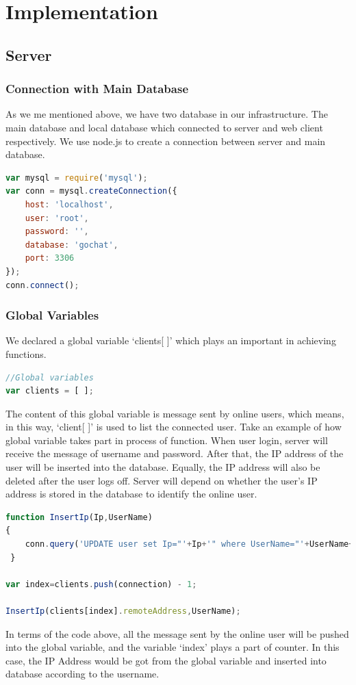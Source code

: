\documentclass[a4paper,11pt]{article}
\begin{document}
\section{Implementation}
\subsection{Server}
\subsubsection{Connection with Main Database}
As we me mentioned above, we have two database in our infrastructure. The main database and local database which connected to server and web client respectively. We use node.js to create a connection between server and main database.
\begin{lstlisting}[language=javascript]
var mysql = require('mysql');
var conn = mysql.createConnection({
    host: 'localhost',
    user: 'root',
    password: '',
    database: 'gochat',
    port: 3306
});
conn.connect();
\end{lstlisting}
\subsubsection{Global Variables}
We declared a global variable ‘clients[ ]’ which plays an important in achieving functions. 
\begin{lstlisting}[language=javascript]
//Global variables
var clients = [ ];
\end{lstlisting}
The content of this global variable is message sent by online users, which means, in this way, ‘client[ ]’ is used to list the connected user. Take an example of how global variable takes part in process of function. When user login, server will receive the message of username and password. After that, the IP address of the user will be inserted into the database. Equally, the IP address will also be deleted after the user logs off. Server will depend on whether the user’s IP address is stored in the database to identify the online user.  
\begin{lstlisting}[language=javascript]
function InsertIp(Ip,UserName)
{
    conn.query('UPDATE user set Ip="'+Ip+'" where UserName="'+UserName+'"',
 }
 
var index=clients.push(connection) - 1;

InsertIp(clients[index].remoteAddress,UserName);
\end{lstlisting}
In terms of the code above, all the message sent by the online user will be pushed into the global variable, and the variable ‘index’ plays a part of counter. In this case, the IP Address would be got from the global variable and inserted into database according to the username.
\end{document}
